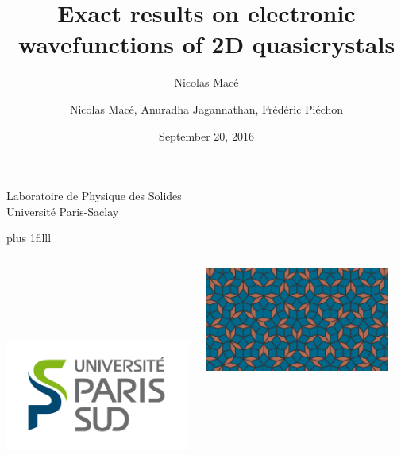 \documentclass[xcolor=x11names,compress,professionalfonts]{beamer}
\author{Nicolas Macé}
\newcommand{\btVFill}{\vskip0pt plus 1filll}%
\renewcommand{\(}{\begin{columns}}
\renewcommand{\)}{\end{columns}}
\newcommand{\<}[1]{\begin{column}{#1}}
\renewcommand{\>}{\end{column}}
\begin{document}
\begin{frame}
\title{{\fontsize{14}{60}\selectfont Exact results on electronic wavefunctions of 2D quasicrystals}}

\author{Nicolas Macé, Anuradha Jagannathan, Frédéric Piéchon}

\institute %
{
  Laboratoire de Physique des Solides\\
  Université Paris-Saclay
}

\date{September 20, 2016}

\titlepage

\btVFill
\begin{columns}
\begin{column}{2cm}
~\\
~\\
~\\
~\\
\raggedright
\includegraphics[scale=.15]{img/LogoUPSUD.png}
\end{column}
\begin{column}{6cm}
\centering
\includegraphics[width=.7\textwidth]{img/cover.png}
\end{column}
\begin{column}{2cm}
~\\
~\\

\end{column}
\end{columns}
\end{frame}
\end{document}
